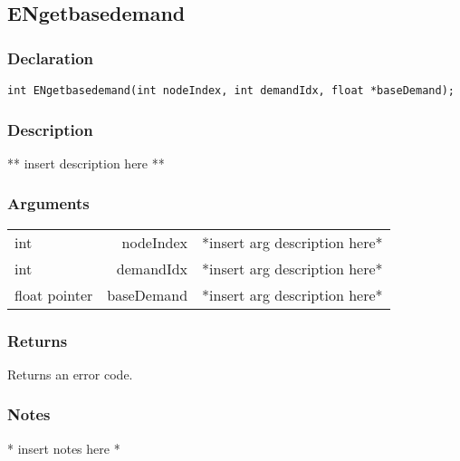 \subsection{ENgetbasedemand}
\subsubsection{Declaration}
\begin{lstlisting}
int ENgetbasedemand(int nodeIndex, int demandIdx, float *baseDemand);
\end{lstlisting}
\subsubsection{Description}
** insert description here **
\subsubsection{Arguments}
\begin{tabular}{l r p{11cm} }
int&nodeIndex&*insert arg description here* \\[6pt]
int&demandIdx&*insert arg description here* \\[6pt]
float pointer&baseDemand&*insert arg description here* \\[6pt]
\end{tabular}
\subsubsection{Returns}
Returns an error code.
\subsubsection{Notes}
* insert notes here *